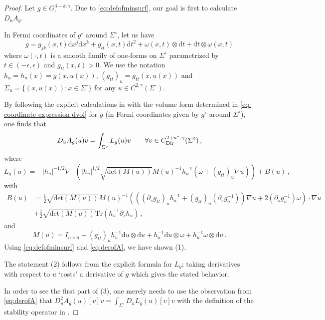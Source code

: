 \documentclass[11pt]{amsart}
\theoremstyle{definition}
\numberwithin{equation}{section}
\newcommand{\abs}[1]{\lvert #1 \rvert}          %
\begin{document}
\begin{proof}
Let $g\in G_\circ^{3+k,\gamma}$. Due to \eqref{eq:defofminsurf}, our goal is first to calculate $D_u A_{g}$. 

In Fermi coordinates of $g^\circ$ around $\Sigma^\circ$, let us have
\[
	g = g_{jk}(x,t)\mathrm{d}x^j \mathrm{d}x^k + g_{tt}(x,t) \mathrm{d} t^2 + \omega(x,t) \otimes\mathrm{d} t+\mathrm{d}t\otimes \omega(x,t)
\]
where $\omega(\cdot,t)$ is a smooth family of one-forms on $\Sigma^\circ$ parametrized by $t\in (-\epsilon,\epsilon)$ and $g_{tt}(x,t) > 0$. We use the notation $h_u = h_u(x) = g(x,u(x))$, $(g_{tt})_u = g_{tt}(x,u(x))$ and $\Sigma_u = \{(x,u(x))\colon x\in \Sigma^\circ\}$ for any $u\in C^{2,\gamma}(\Sigma^\circ)$. 

By following the explicit calculations in \cite[\S~3.1]{carstea2024calder} with the volume form determined in \eqref{eq: coordinate expression dvol} for $g$ (in Fermi coordinates given by $g^\circ$ around $\Sigma^\circ$), one finds that 
\begin{equation}\label{eq:derofA}
	D_u A_{g}(u)v = \int_{\Sigma^\circ} L_{g}(u)v\qquad 	\forall v\in C^{2+n^\ast,\gamma}_{\rm Dir}(\Sigma^\circ)\,,
\end{equation}
where
\[
	L_{g}(u) = -\abs{h_u}^{-1/2} \nabla\cdot \left(\abs{h_u}^{1/2}\sqrt{\mathrm{det}(M(u))}M(u)^{-1} h_u^{-1}(\omega+ (g_{tt})_u \nabla u)\right) + B(u)\,,
\]
with
\begin{align*}
	B(u) &= \frac{1}{2}\sqrt{\mathrm{det}(M(u))}M(u)^{-1} \left(((\partial_sg_{tt})_u h_u^{-1} + (g_{tt})_u(\partial_s g^{-1}_u))\nabla u + 2 (\partial_s g^{-1}_u)\omega\right)\cdot \nabla u\\
	&+ \frac{1}{2}\sqrt{\mathrm{det}(M(u))} \mathrm{Tr}(h_u^{-1}\partial_s h_u)\,,
\end{align*}
and
\[
	M(u) = I_{n\times n}+(g_{tt})_uh_u^{-1}\mathrm{d}u\otimes\mathrm{d}u+h_u^{-1}\mathrm{d}u\otimes \omega + h_u^{-1}\omega\otimes \mathrm{d}u\,.
\]
Using \eqref{eq:defofminsurf} and \eqref{eq:derofA}, we have shown (1). 

The statement (2) follows from the explicit formula for $L_{g}$; taking derivatives with respect to $u$ `costs' a derivative of $g$ which gives the stated behavior. %

In order to see the first part of (3), one merely needs to use the observation from \eqref{eq:derofA} that $D_u^2 A_{g}(u)[v]v=\int_{\Sigma^\circ} D_u L_{g}(u)[v]v$ with the definition of the stability operator in \cite[Eq.~(1.143)]{MR2780140}.%


\end{proof}
\end{document}
